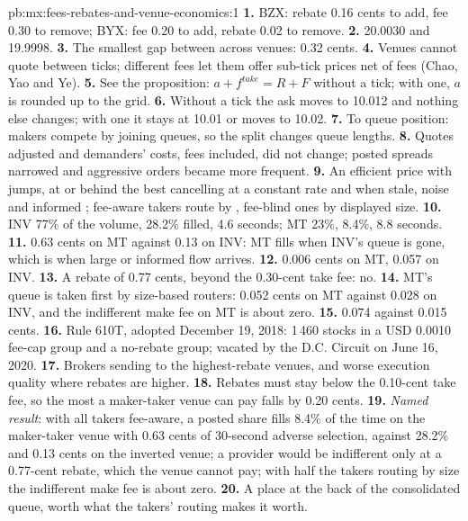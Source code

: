 \begin{solution}{pb:mx:fees-rebates-and-venue-economics:1}
\textbf{1.} BZX: rebate 0.16 cents to add, fee 0.30 to remove; BYX: fee 0.20 to add, rebate 0.02 to remove.
\textbf{2.} 20.0030 and 19.9998.
\textbf{3.} The smallest gap between  across venues: 0.32 cents.
\textbf{4.} Venues cannot quote between ticks; different fees let them offer sub-tick prices net of fees (Chao, Yao and Ye).
\textbf{5.} See the proposition: $a+f^{take}=R+F$ without a tick; with one, $a$ is rounded up to the grid.
\textbf{6.} Without a tick the ask moves to 10.012 and nothing else changes; with one it stays at 10.01 or moves to 10.02.
\textbf{7.} To queue position: makers compete by joining queues, so the split changes queue lengths.
\textbf{8.} Quotes adjusted and demanders' costs, fees included, did not change; posted spreads narrowed and aggressive orders became more frequent.
\textbf{9.} An efficient price with jumps,  at or behind the best cancelling at a constant rate and when stale, noise and informed ;
fee-aware takers route by , fee-blind ones by displayed size.
\textbf{10.} INV 77\% of the volume, 28.2\% filled, 4.6 seconds; MT 23\%, 8.4\%, 8.8 seconds.
\textbf{11.} 0.63 cents on MT against 0.13 on INV: MT fills when INV's queue is gone, which is when large or informed flow arrives.
\textbf{12.} 0.006 cents on MT, 0.057 on INV.
\textbf{13.} A rebate of 0.77 cents, beyond the 0.30-cent take fee: no.
\textbf{14.} MT's queue is taken first by size-based routers: 0.052 cents on MT against 0.028 on INV, and the indifferent make fee on MT is about zero.
\textbf{15.} 0.074 against 0.015 cents.
\textbf{16.} Rule 610T, adopted December 19, 2018: 1\,460 stocks in a USD 0.0010 fee-cap group and a no-rebate group; vacated by the D.C. Circuit on
June 16, 2020.
\textbf{17.} Brokers sending  to the highest-rebate venues, and worse  execution quality where rebates are higher.
\textbf{18.} Rebates must stay below the 0.10-cent take fee, so the most a maker-taker venue can pay falls by 0.20 cents.
\textbf{19.} \emph{Named result}: with all takers fee-aware, a posted share fills 8.4\% of the time on the maker-taker venue with 0.63 cents of 30-second
adverse selection, against 28.2\% and 0.13 cents on the inverted venue; a provider would be indifferent only at a 0.77-cent rebate, which the venue cannot
pay; with half the takers routing by size the indifferent make fee is about zero.
\textbf{20.} A place at the back of the consolidated queue, worth what the takers' routing makes it worth.
\end{solution}

